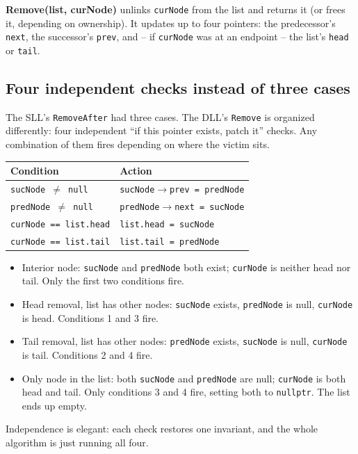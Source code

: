 \documentclass[11pt]{article}
\begin{document}
\begin{defnbox}
\textbf{Remove(list, curNode)} unlinks \texttt{curNode} from the
list and returns it (or frees it, depending on ownership). It
updates up to four pointers: the predecessor's \texttt{next}, the
successor's \texttt{prev}, and -- if \texttt{curNode} was at an
endpoint -- the list's \texttt{head} or \texttt{tail}.
\end{defnbox}

\subsection{Four independent checks instead of three cases}

The SLL's \texttt{RemoveAfter} had three cases. The DLL's
\texttt{Remove} is organized differently: four independent
``if this pointer exists, patch it'' checks. Any combination of
them fires depending on where the victim sits.

\begin{center}
\footnotesize
\renewcommand{\arraystretch}{1.3}
\begin{tabular}{@{}p{5.3cm}p{6.7cm}@{}}
\hline
\textbf{Condition} & \textbf{Action} \\
\hline
\texttt{sucNode $\neq$ null}    & \texttt{sucNode$\to$prev = predNode} \\
\texttt{predNode $\neq$ null}   & \texttt{predNode$\to$next = sucNode} \\
\texttt{curNode == list.head}   & \texttt{list.head = sucNode} \\
\texttt{curNode == list.tail}   & \texttt{list.tail = predNode} \\
\hline
\end{tabular}
\end{center}

\begin{ideabox}
\begin{itemize}[leftmargin=*]
  \item Interior node: \texttt{sucNode} and \texttt{predNode} both
        exist; \texttt{curNode} is neither head nor tail. Only the
        first two conditions fire.
  \item Head removal, list has other nodes: \texttt{sucNode}
        exists, \texttt{predNode} is null, \texttt{curNode} is
        head. Conditions 1 and 3 fire.
  \item Tail removal, list has other nodes: \texttt{predNode}
        exists, \texttt{sucNode} is null, \texttt{curNode} is tail.
        Conditions 2 and 4 fire.
  \item Only node in the list: both \texttt{sucNode} and
        \texttt{predNode} are null; \texttt{curNode} is both head
        and tail. Only conditions 3 and 4 fire, setting both to
        \texttt{nullptr}. The list ends up empty.
\end{itemize}
Independence is elegant: each check restores one invariant, and
the whole algorithm is just running all four.
\end{ideabox}
\end{document}
